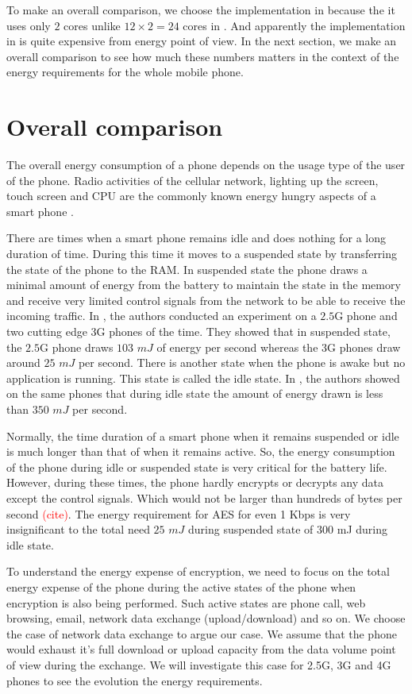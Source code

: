 To make an overall comparison, we choose the implementation in \cite{Ruhr_2009} because the it uses only $2$ cores unlike $12\times 2 = 24$ cores in \cite{Ruhr_2011}. And apparently the implementation in \cite{Pune_2012} is quite expensive from energy point of view. In the next section, we make an overall comparison to see how much these numbers matters in the context of the energy requirements for the whole mobile phone.

\section{Overall comparison}
The overall energy consumption of a phone depends on the usage type of the user of the phone. Radio activities of the cellular network, lighting up the screen, touch screen and CPU are the commonly known energy hungry aspects of a smart phone \cite{Usenix_2010}. 

There are times when a smart phone remains idle and does nothing for a long duration of time. During this time it moves to a suspended state by transferring the state of the phone to the RAM. In suspended state the phone draws a minimal amount of energy from the battery to maintain the state in the memory and receive very limited control signals from the network to be able to receive the incoming traffic. In \cite{Usenix_2010}, the authors conducted an experiment on a $2.5$G phone and two cutting edge $3$G phones of the time. They showed that in suspended state, the $2.5$G phone draws $103$ $mJ$ of energy per second whereas the 3G phones draw around $25$ $mJ$ per second. There is another state when the phone is awake but no application is running. This state is called the idle state. In \cite{Usenix_2010}, the authors showed on the same phones that during idle state the amount of energy drawn is less than $350$ $mJ$ per second. 

Normally, the time duration of a smart phone when it remains suspended or idle is much longer than that of when it remains active. So, the energy consumption of the phone during idle or suspended state is very critical for the battery life. However, during these times, the phone hardly encrypts or decrypts any data except the control signals. Which would not be larger than hundreds of bytes per second \textcolor{red}{(cite)}. The energy requirement for AES for even 1 Kbps is very insignificant to the total need $25$ $mJ$ during suspended state of 300 mJ during idle state.

To understand the energy expense of encryption, we need to focus on the total energy expense of the phone during the active states of the phone when encryption is also being performed. Such active states are phone call, web browsing, email, network data exchange (upload/download) and so on. We choose the case of network data exchange to argue our case. We assume that the phone would exhaust it's full download or upload capacity from the data volume point of view during the exchange. We will investigate this case for 2.5G, 3G and 4G phones to see the evolution the energy requirements.

